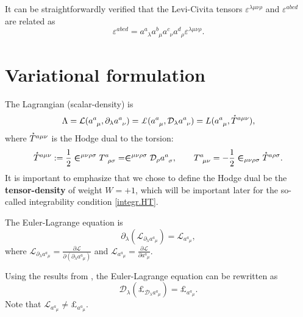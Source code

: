\documentclass[
10pt, %
a4paper, %
oneside, %
headinclude,footinclude, %
BCOR5mm, %
]{scrartcl}
\newcommand{\IP}[1]{{\color{Red}IP:\ \ #1}}
\newcommand{\pd}{\partial}
\newcommand{\tetr}[2]{a^{#1}_{\phantom{#1}#2}}
\newcommand{\D}[1]{\mathcal{D}_{#1}} %
\newcommand{\Tors}[2]{T^{#1}_{\phantom{a}#2}}
\newcommand{\Lag}{\mathcal{L}}	%
\newcommand{\Lagcov}{\pounds}%
\newcommand{\Laghodge}{L}%
\newcommand{\LCsymb}{\bm{\in}}    %
\newcommand{\LCtens}{\varepsilon} %
\newcommand{\HT}[1]{\accentset{\star}{T}^{#1}}
\begin{document}
It can be straightforwardly verified that the Levi-Civita tensors $ 
\LCtens^{\lambda\mu\nu\rho} $ and 
$ \LCtens^{abcd} $ are 
related as
\begin{equation}
\LCtens^{abcd} = 
\tetr{a}{\lambda}\tetr{b}{\mu}\tetr{c}{\nu}\tetr{d}{\rho}\LCtens^{\lambda\mu\nu\rho}.
\end{equation}


\section{Variational formulation}


The Lagrangian (scalar-density) is 
\begin{equation}
\Lambda = \Lag(\tetr{a}{\mu},\pd_\lambda\tetr{a}{\nu}) = 
\Lagcov(\tetr{a}{\mu},\D{\lambda}\tetr{a}{\nu})  = \Laghodge(\tetr{a}{\mu},\HT{a\mu\nu}),
\end{equation}
where $ \HT{a\mu\nu} $ is the Hodge dual to the 
torsion:
\begin{equation}\label{eqn.Hodge.def}
\HT{a\mu\nu} := \frac{1}{2}\LCsymb^{\mu\nu\rho\sigma}\Tors{a}{\rho\sigma} = 
\LCsymb^{\mu\nu\rho\sigma}\D{\rho}\tetr{a}{\sigma}, \qquad \Tors{a}{\mu\nu} = 
-\frac{1}{2}\LCsymb_{\mu\nu\rho\sigma}\HT{a\rho\sigma}.
\end{equation}
It is important to emphasize that we chose to define the Hodge dual be the 
\textbf{tensor-density} of weight $ W=+1 $, which will be important later for 
the so-called integrability condition \eqref{integr.HT}.



The Euler-Lagrange equation is
\begin{equation}
\pd_\lambda(\Lag_{\pd_\lambda\tetr{a}{\mu}}) = \Lag_{\tetr{a}{\mu}},
\end{equation}
where $ \Lag_{\pd_\lambda\tetr{a}{\mu}} = \frac{\pd \Lag}{\pd(\pd_\lambda\tetr{a}{\mu})} $ and $ 
\Lag_{\tetr{a}{\mu}} = \frac{\pd \Lag}{\pd \tetr{a}{\mu}} $.


Using the results from \cite{Lewis2009,Lorce2013}, the Euler-Lagrange equation can be rewritten as
\begin{equation}\label{eqn.cov.field.PDE}
\D{\lambda}(\Lagcov_{\D{\lambda}\tetr{a}{\mu}}) = \Lagcov_{\tetr{a}{\mu}}.
\end{equation}
Note that $  \Lag_{\tetr{a}{\mu}} \neq  \Lagcov_{\tetr{a}{\mu}}. $
\end{document}
